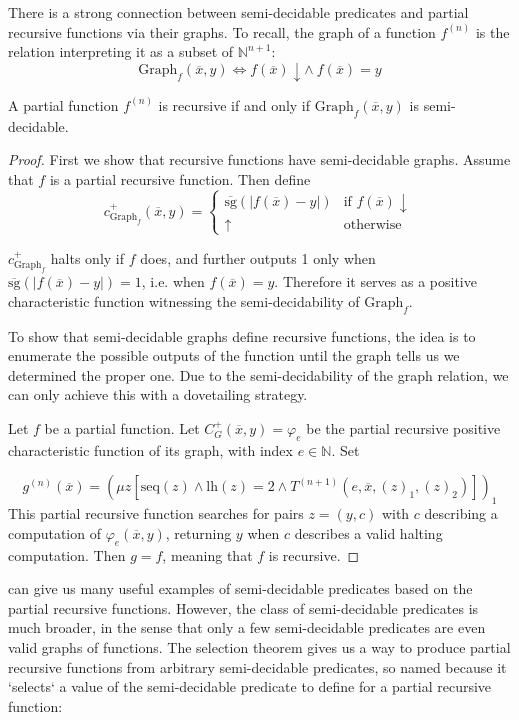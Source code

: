 There is a strong connection between semi-decidable predicates and partial recursive functions via their graphs. To recall, the graph of a function $f^{(n)}$ is the relation interpreting it as a subset of $\mathbb{N}^{n+1}$: \[
\text{Graph}_f(\overline{x}, y) \iff f(\overline{x}) \downarrow \land \ f(\overline{x}) = y\]

\begin{proposition}\label{graph-decidable}
A partial function $f^{(n)}$ is recursive if and only if  
$\text{Graph}_f(\overline{x}, y)$ is semi-decidable.
\end{proposition}
\begin{proof}
First we show that recursive functions have semi-decidable graphs. Assume that $f$ is a partial recursive function. Then define \[
    c^+_{\text{Graph}_f}(\overline{x}, y) = \begin{cases}
        \overline{\text{sg}}(|f(\overline{x}) - y|) & \text{if } f(\overline{x}) \downarrow \\
        \uparrow & \text{otherwise}
    \end{cases}
\]

$c^+_{\text{Graph}_f}$ halts only if $f$ does, and further outputs 1 only when $\overline{\text{sg}}(|f(\overline{x}) - y|) = 1$, i.e. when $f(\overline{x}) = y$. Therefore it serves as a positive characteristic function witnessing the semi-decidability of $\text{Graph}_f$.

To show that semi-decidable graphs define recursive functions, the idea is to enumerate the possible outputs of the function until the graph tells us we determined the proper one. Due to the semi-decidability of the graph relation, we can only achieve this with a dovetailing strategy.

Let $f$ be a partial function. Let $C_G^+(\overline{x}, y) = \varphi_e$ be the partial recursive positive characteristic function of its graph, with index $e \in \mathbb{N}$. Set

\[
    g^{(n)}(\overline{x}) = \left(\mu z \left[\text{seq}(z) \land \text{lh}(z) = 2 \land T^{(n+1)}(e, \overline{x}, (z)_1, (z)_2)\right]\right)_1
\]
This partial recursive function searches for pairs $z = (y, c)$ with $c$ describing a computation of $\varphi_e(\overline{x}, y)$, returning $y$ when $c$ describes a valid halting computation. Then $g = f$, meaning that $f$ is recursive.
\end{proof}

 can give us many useful examples of semi-decidable predicates based on the partial recursive functions. However, the class of semi-decidable predicates is much broader, in the sense that only a few semi-decidable predicates are even valid graphs of functions. The selection theorem gives us a way to produce partial recursive functions from arbitrary semi-decidable predicates, so named because it `selects` a value of the semi-decidable predicate to define for a partial recursive function:

